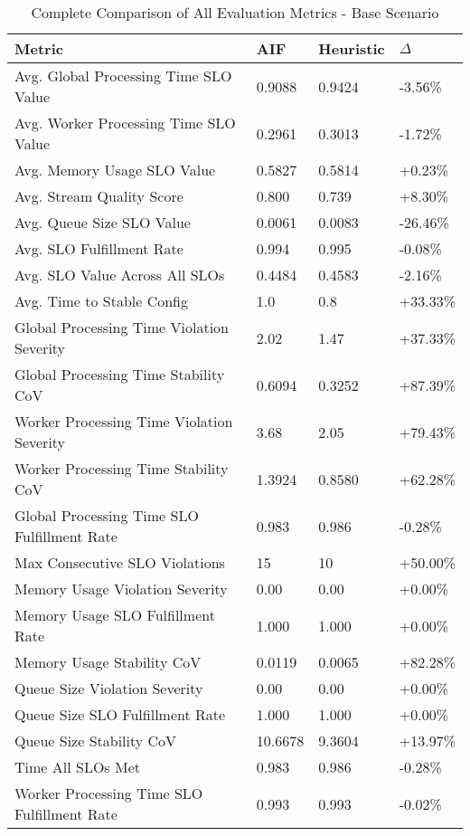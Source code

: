 \begin{table}[h!]
\centering
\small
\caption{Complete Comparison of All Evaluation Metrics - Base Scenario}
\label{tab:complete_results_basic}
\begin{tabular}{@{}llll@{}}
\toprule
\textbf{Metric} & \textbf{AIF} & \textbf{Heuristic} & \textbf{$\Delta$} \\
\midrule
Avg. Global Processing Time SLO Value & 0.9088 & 0.9424 & -3.56\% \\
Avg. Worker Processing Time SLO Value & 0.2961 & 0.3013 & -1.72\% \\
Avg. Memory Usage SLO Value & 0.5827 & 0.5814 & +0.23\% \\
Avg. Stream Quality Score & 0.800 & 0.739 & +8.30\% \\
Avg. Queue Size SLO Value & 0.0061 & 0.0083 & -26.46\% \\
Avg. SLO Fulfillment Rate & 0.994 & 0.995 & -0.08\% \\
Avg. SLO Value Across All SLOs & 0.4484 & 0.4583 & -2.16\% \\
Avg. Time to Stable Config & 1.0 & 0.8 & +33.33\% \\
Global Processing Time Violation Severity & 2.02 & 1.47 & +37.33\% \\
Global Processing Time Stability CoV & 0.6094 & 0.3252 & +87.39\% \\
Worker Processing Time Violation Severity & 3.68 & 2.05 & +79.43\% \\
Worker Processing Time Stability CoV & 1.3924 & 0.8580 & +62.28\% \\
Global Processing Time SLO Fulfillment Rate & 0.983 & 0.986 & -0.28\% \\
Max Consecutive SLO Violations & 15 & 10 & +50.00\% \\
Memory Usage Violation Severity & 0.00 & 0.00 & +0.00\% \\
Memory Usage SLO Fulfillment Rate & 1.000 & 1.000 & +0.00\% \\
Memory Usage Stability CoV & 0.0119 & 0.0065 & +82.28\% \\
Queue Size Violation Severity & 0.00 & 0.00 & +0.00\% \\
Queue Size SLO Fulfillment Rate & 1.000 & 1.000 & +0.00\% \\
Queue Size Stability CoV & 10.6678 & 9.3604 & +13.97\% \\
Time All SLOs Met & 0.983 & 0.986 & -0.28\% \\
Worker Processing Time SLO Fulfillment Rate & 0.993 & 0.993 & -0.02\% \\
\bottomrule
\end{tabular}
\end{table}